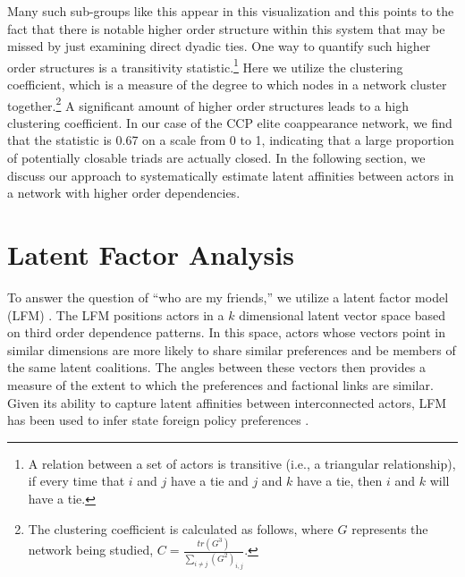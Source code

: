 \documentclass[11pt,english]{article}
\begin{document}
\begin{flushleft}
Many such sub-groups like this appear in this visualization and this points to the fact that there is notable higher order structure within this system that may be missed by just examining direct dyadic ties. One way to quantify such higher order structures is a transitivity statistic.\footnote{A relation between a set of actors is transitive (i.e., a triangular relationship), if every time that $i$ and $j$ have a tie and $j$ and $k$ have a tie, then $i$ and $k$ will have a tie.} Here we utilize the clustering coefficient, which is a measure of the degree to which nodes in a network cluster together.\footnote{The clustering coefficient is calculated as follows, where $G$ represents the network being studied, $C=\frac{tr(G^{3})}{\sum_{i\neq j}(G^{2})_{i,j}}$.} A significant amount of higher order structures  leads to a high clustering coefficient. In our case of the CCP elite coappearance network, we find that the statistic is 0.67 on a scale from 0 to 1, indicating that a large proportion of potentially closable triads are actually closed. In the following section, we discuss our approach to systematically estimate latent affinities between actors in a network with higher order dependencies.

\section*{Latent Factor Analysis}

To answer the question of ``who are my friends,'' we utilize a latent factor model (LFM) \citep{Hoff2005,Minhas2016a}. The LFM positions actors in a $k$ dimensional latent vector space based on third order dependence patterns. In this space, actors whose vectors point in similar dimensions are more likely to share similar preferences and be members of the same latent coalitions. The angles between these vectors then provides a measure of the extent to which the preferences and factional links are similar. Given its ability to capture latent affinities between interconnected actors, LFM has been used to infer state foreign policy preferences \citep{gallop:minhas:2018}.


\end{flushleft}
\end{document}
